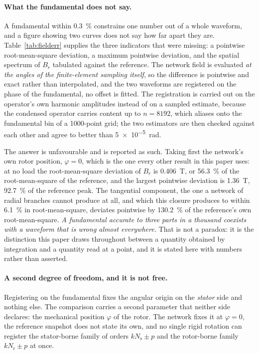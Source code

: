 \documentclass[10pt,a4paper,twocolumn]{article}
\theoremstyle{plain}
\theoremstyle{remark}
\begin{document}
\paragraph{What the fundamental does not say.}
A fundamental within \SI{0.3}{\percent} constrains one number out of a
whole waveform, and a figure showing two curves does not say how far
apart they are. Table~\ref{tab:fielderr} supplies the three indicators
that were missing: a pointwise root-mean-square deviation, a maximum
pointwise deviation, and the spatial spectrum of $B_r$ tabulated against
the reference. The network field is evaluated \emph{at the angles of the
finite-element sampling itself}, so the difference is pointwise and
exact rather than interpolated, and the two waveforms are registered on
the phase of the fundamental, no offset is fitted. The registration is
carried out on the operator's own harmonic amplitudes instead of on a
sampled estimate, because the condensed operator carries content up to
$n=\num{8192}$, which aliases onto the fundamental bin of a
\num{1000}-point grid; the two estimators are then checked against each
other and agree to better than \SI{5e-5}{\radian}.

The answer is unfavourable and is reported as such. Taking first the
network's own rotor position, $\varphi=0$, which is the one every other
result in this paper uses: at no load the root-mean-square deviation of
$B_r$ is \SI{0.406}{\tesla}, or
\SI{56.3}{\percent} of the root-mean-square of the reference, and the
largest pointwise deviation is \SI{1.36}{\tesla}, \SI{92.7}{\percent} of
the reference peak. The tangential component, the one a network of
radial branches cannot produce at all, and which this closure produces
to within \SI{6.1}{\percent} in root-mean-square, deviates pointwise by
\SI{130.2}{\percent} of the reference's own root-mean-square.
\emph{A fundamental accurate to
three parts in a thousand coexists with a waveform that is wrong almost
everywhere.} That is not a paradox: it is the distinction this paper
draws throughout between a quantity obtained by integration and a
quantity read at a point, and it is stated here with numbers rather than
asserted.

\paragraph{A second degree of freedom, and it is not free.}
Registering on the fundamental fixes the angular origin on the
\emph{stator} side and nothing else. The comparison carries a second
parameter that neither side declares: the mechanical position
$\varphi$ of the rotor. The network fixes it at $\varphi=0$, the
reference snapshot does not state its own, and no single rigid rotation
can register the stator-borne family of orders $kN_{\mathrm{s}}\pm p$
and the rotor-borne family $kN_{\mathrm{r}}\pm p$ at once.
\end{document}
